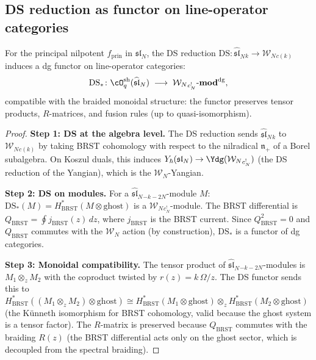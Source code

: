 \subsection{DS reduction as functor on line-operator categories}

\begin{theorem}
For the principal nilpotent $f_{\mathrm{prin}}$ in
$\mathfrak{sl}_N$, the DS reduction
$\mathrm{DS}\colon
\widehat{\mathfrak{sl}}_N{}_k\to\mathcal{W}_N{}_{c(k)}$
induces a dg functor on line-operator categories:
\begin{equation}
\mathrm{DS}_*\colon
\cO_q^{\mathrm{sh}}(\widehat{\mathfrak{sl}}_N)
\;\longrightarrow\;
\mathcal{W}_N{}_{c^!_N}\text{-}\mathbf{mod}^{\mathrm{dg}},
\end{equation}
compatible with the braided monoidal structure: the functor
preserves tensor products, $R$-matrices, and fusion rules
(up to quasi-isomorphism).
\end{theorem}

\begin{proof}
\textbf{Step 1: DS at the algebra level.}
The DS reduction sends $\widehat{\mathfrak{sl}}_N{}_k$
to $\mathcal{W}_N{}_{c(k)}$ by taking BRST cohomology
with respect to the nilradical $\mathfrak{n}_+$ of a
Borel subalgebra. On Koszul duals, this induces
$Y_\hbar(\mathfrak{sl}_N)\to\Ydg(\mathcal{W}_N{}_{c^!_N})$
(the DS reduction of the Yangian), which is the
$\mathcal{W}_N$-Yangian.

\textbf{Step 2: DS on modules.}
For a $\widehat{\mathfrak{sl}}_N{}_{-k-2N}$-module $M$:
$\mathrm{DS}_*(M)
=H^*_{\mathrm{BRST}}(M\otimes\mathrm{ghost})$
is a $\mathcal{W}_N{}_{c^!_N}$-module. The BRST
differential is $Q_{\mathrm{BRST}}=\oint j_{\mathrm{BRST}}(z)\,dz$,
where $j_{\mathrm{BRST}}$ is the BRST current. Since
$Q_{\mathrm{BRST}}^2=0$ and $Q_{\mathrm{BRST}}$
commutes with the $\mathcal{W}_N$ action (by construction),
$\mathrm{DS}_*$ is a functor of dg categories.

\textbf{Step 3: Monoidal compatibility.}
The tensor product of
$\widehat{\mathfrak{sl}}_N{}_{-k-2N}$-modules is
$M_1\otimes_z M_2$ with the coproduct twisted by
$r(z)=k\,\Omega/z$. The DS functor sends this to
$H^*_{\mathrm{BRST}}((M_1\otimes_z M_2)\otimes\mathrm{ghost})
\cong
H^*_{\mathrm{BRST}}(M_1\otimes\mathrm{ghost})
\otimes_z
H^*_{\mathrm{BRST}}(M_2\otimes\mathrm{ghost})$
(the K\"unneth isomorphism for BRST cohomology, valid
because the ghost system is a tensor factor). The
$R$-matrix is preserved because
$Q_{\mathrm{BRST}}$ commutes with the braiding
$R(z)$ (the BRST differential acts only on the
ghost sector, which is decoupled from the spectral
braiding).
\end{proof}

